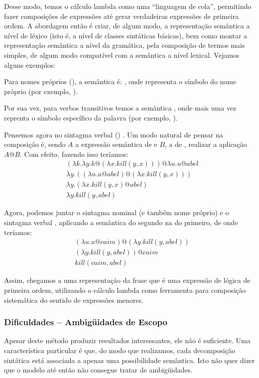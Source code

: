 Desse modo, temos o cálculo lambda como uma ``linguagem de cola'', permitindo fazer composições de expressões até gerar verdadeiras expressões de primeira ordem. A abordagem então é criar, de algum modo, a representação semântica a nível de léxico (isto é, a nível de classes sintáticas básicas), bem como montar a representação semântica a nível da gramática, pela composição de termos mais simples, de algum modo compatível com a semântica a nível lexical. Vejamos alguns exemplos:

Para nomes próprios (), a semântica é: , onde  representa o símbolo do nome próprio (por exemplo, ).

Por sua vez, para verbos transitivos temos a semântica , onde mais uma vez  reprenta o símbolo específico da palavra (por exemplo, ).

Pensemos agora no sintagma verbal () . Um modo natural de pensar na composição é, sendo $A$ a expressão semântica de  e $B$, a de , realizar a aplicação $A@B$. Com efeito, fazendo isso teríamos:
\begin{align*}
&(\lambda k. \lambda y. k@(\lambda x. kill(y,x))) @ \lambda u. u@abel \\
& \lambda y. ((\lambda u. u@abel)@(\lambda x. kill(y,x))) \\
& \lambda y. (\lambda x.kill(y,x)@abel) \\
& \lambda y. kill(y,abel)
\end{align*}

Agora, podemos juntar o sintagma nominal (e também nome próprio)  e o sintagma verbal , aplicando a semântica do segundo na do primeiro, de onde teríamos:
\begin{align*}
&(\lambda u. u@caim)@(\lambda y.kill(y,abel)) \\
& (\lambda y. kill(y,abel))@caim \\
& kill(caim,abel)
\end{align*}

Assim, chegamos a uma representação da frase  que é uma expressão de lógica de primeira ordem, utilizando o cálculo lambda como ferramenta para composição sistemática do sentido de expressões menores.

\subsubsection{Dificuldades -- Ambigüidades de Escopo}
Apesar deste método produzir resultados interessantes, ele não é suficiente. Uma característica particular é que, do modo que realizamos, cada decomposição sintática está associada a apenas uma possibilidade semântica. Isto não quer dizer que o modelo até então não consegue tratar de ambigüidades.

